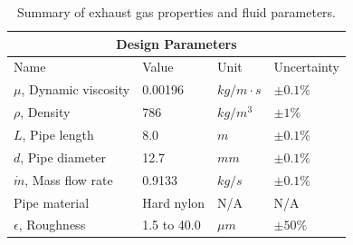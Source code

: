 \documentclass[9pt]{article} %
\numberwithin{equation}{section} %
\begin{document}
\begin{table}[!htb]
\centering
\begin{tabular}{ |p{4cm}||p{4cm}|p{2cm}|p{2cm}|  }
\hline
\multicolumn{4}{|c|}{Design Parameters} \\
\hline
Name & Value & Unit & Uncertainty \\
\hline
$\mu$, Dynamic viscosity  &  0.00196  &  $kg/m \cdot s$  &  $\pm 0.1 \%$ \\
$\rho$, Density  &  786  &  $kg/m^{3}$  &  $\pm 1 \%$ \\
$L$, Pipe length  &  8.0  &  $m$  &  $\pm 0.1 \%$  \\
$d$, Pipe diameter  &  12.7  &  $mm$  &   $\pm 0.1 \%$ \\
$\dot{m}$, Mass flow rate  &  0.9133  &  $kg/s$  &   $\pm 0.1 \%$ \\
Pipe material  &  Hard nylon  &  N/A  &  N/A \\
$\epsilon$, Roughness  &  1.5 to 40.0  &  $\mu m$  &  $\pm 50 \%$ \\
\hline
\end{tabular}
\caption{Summary of exhaust gas properties and fluid parameters.}
\label{table:pipe_parameters}
\end{table}

\printbibliography
\end{document}
